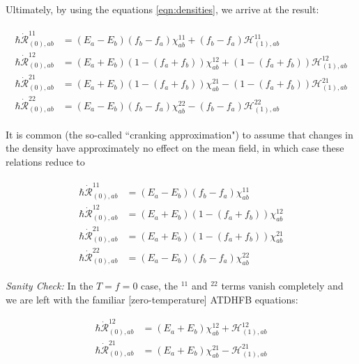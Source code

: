 \noindent Ultimately, by using the equations \ref{eqn:densities}, we arrive at the result:

\begin{align}\label{eqn:chi-rdot_uncranked}
\begin{aligned}
\hbar \dot{\mathcal{R}}_{(0),ab}^{11} &= (E_a-E_b)(f_b-f_a)\chi_{ab}^{11} + (f_b-f_a)\mathcal{H}^{11}_{(1),ab} \\
\hbar \dot{\mathcal{R}}_{(0),ab}^{12} &= (E_a+E_b)\left(1-(f_a+f_b)\right)\chi_{ab}^{12} + \left(1-(f_a+f_b)\right)\mathcal{H}^{12}_{(1),ab} \\
\hbar \dot{\mathcal{R}}_{(0),ab}^{21} &= (E_a+E_b)\left(1-(f_a+f_b)\right)\chi_{ab}^{21} - \left(1-(f_a+f_b)\right)\mathcal{H}^{21}_{(1),ab} \\
\hbar \dot{\mathcal{R}}_{(0),ab}^{22} &= (E_a-E_b)(f_b-f_a)\chi_{ab}^{22} - (f_b-f_a)\mathcal{H}^{22}_{(1),ab}
\end{aligned}
\end{align}

It is common (the so-called ``cranking approximation") to assume that changes in the density have approximately no effect on the mean field, in which case these relations reduce to

\begin{tcolorbox}
\begin{align}\label{eqn:chi-rdot}
\begin{aligned}
\hbar \dot{\mathcal{R}}_{(0),ab}^{11} &= (E_a-E_b)(f_b-f_a)\chi_{ab}^{11} \\
\hbar \dot{\mathcal{R}}_{(0),ab}^{12} &= (E_a+E_b)\left(1-(f_a+f_b)\right)\chi_{ab}^{12} \\
\hbar \dot{\mathcal{R}}_{(0),ab}^{21} &= (E_a+E_b)\left(1-(f_a+f_b)\right)\chi_{ab}^{21} \\
\hbar \dot{\mathcal{R}}_{(0),ab}^{22} &= (E_a-E_b)(f_b-f_a)\chi_{ab}^{22}
\end{aligned}
\end{align}
\end{tcolorbox}

\noindent\textit{Sanity Check:} In the $T=f=0$ case, the $^{11}$ and $^{22}$ terms vanish completely and we are left with the familiar [zero-temperature] ATDHFB equations:

\begin{align*}
\hbar \dot{\mathcal{R}}_{(0),ab}^{12} &= (E_a+E_b)\chi_{ab}^{12} + \mathcal{H}^{12}_{(1),ab} \\
\hbar \dot{\mathcal{R}}_{(0),ab}^{21} &= (E_a+E_b)\chi_{ab}^{21} - \mathcal{H}^{21}_{(1),ab}
\end{align*}

